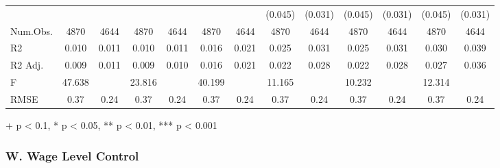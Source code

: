 \documentclass[
]{article}
\begin{document}
\begin{table}[t]
\begin{tabular*}{\linewidth}{@{\extracolsep{\fill}}lcccccccccccc}
{} & {} & {} & {} & {} & {} & {} & {(0.045)} & {(0.031)} & {(0.045)} & {(0.031)} & {(0.045)} & {(0.031)} \\ 
Num.Obs. & 4870 & 4644 & 4870 & 4644 & 4870 & 4644 & 4870 & 4644 & 4870 & 4644 & 4870 & 4644 \\ 
R2 & 0.010 & 0.011 & 0.010 & 0.011 & 0.016 & 0.021 & 0.025 & 0.031 & 0.025 & 0.031 & 0.030 & 0.039 \\ 
R2 Adj. & 0.009 & 0.011 & 0.009 & 0.010 & 0.016 & 0.021 & 0.022 & 0.028 & 0.022 & 0.028 & 0.027 & 0.036 \\ 
F & 47.638 &  & 23.816 &  & 40.199 &  & 11.165 &  & 10.232 &  & 12.314 &  \\ 
RMSE & 0.37 & 0.24 & 0.37 & 0.24 & 0.37 & 0.24 & 0.37 & 0.24 & 0.37 & 0.24 & 0.37 & 0.24 \\ 
\bottomrule
\end{tabular*}
\begin{minipage}{\linewidth}
+ p < 0.1, * p < 0.05, ** p < 0.01, *** p < 0.001\\
\end{minipage}
\end{table}

\subsubsection{W. Wage Level Control}\label{w.-wage-level-control-1}
\end{document}

